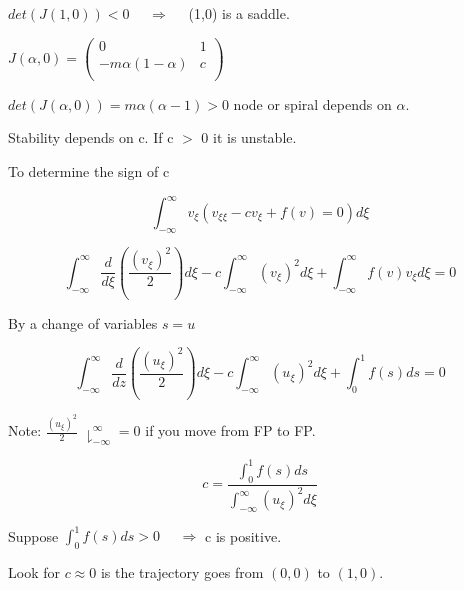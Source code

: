 \documentclass[]{article}
\numberwithin{equation}{section}		%
\begin{document}
$det(J(1,0)) < 0$ \ \ $ \Rightarrow$ \ \ (1,0) is a saddle.


\begin{center}
$J(\alpha,0)=
\begin{pmatrix}
  0 & 1 \\
  -m\alpha(1-\alpha) & c \\
\end{pmatrix}$
\par\end{center}

$det(J(\alpha,0))=m\alpha(\alpha-1) > 0$ node or spiral depends on $\alpha$.

Stability depends on c. If c $>$ 0 it is unstable.


To determine the sign of c

\begin{equation}
\int_{-\infty}^{\infty} v_\xi(v_{\xi\xi}-cv_\xi+f(v)=0)d\xi \nonumber
\end{equation}

\begin{equation}
\int_{-\infty}^{\infty} \frac{d}{d\xi}(\frac{(v_\xi)^2}{2})d\xi-c\int_{-\infty}^{\infty}(v_\xi)^{2}d\xi+\int_{-\infty}^{\infty} f(v)v_\xi d\xi=0 \nonumber
\end{equation}


By a change of variables $s=u$


\begin{equation}
\int_{-\infty}^{\infty}\frac{d}{dz}(\frac{(u_\xi)^{2}}{2})d\xi-c\int_{-\infty}^{\infty}(u_\xi)^{2}d\xi+\int_{0}^{1}f(s)ds=0 \nonumber
\end{equation}


\indent Note: $\frac{(u_\xi)^{2}}{2}$ $\downharpoonright_{-\infty}^{\infty}=0$ if you move from FP to FP.


\begin{equation}
c=\unit{\frac{\int_{0}^{1}f(s)ds}{\int_{-\infty}^{\infty}(u_\xi)^{2}d\xi}} \nonumber
\end{equation}


Suppose $\int_0^1 f(s) ds > 0$ \ \ $ \Rightarrow$ c is positive.

Look for $c\approx0$ is the trajectory goes from $(0,0)$ to $(1,0)$.
\end{document}
